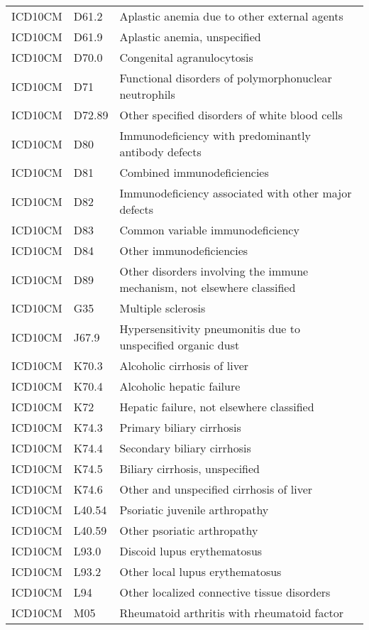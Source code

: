 \begin{longtable}{p{}p{}p{}}
  ICD10CM & D61.2 & Aplastic anemia due to other external agents \\ 
  ICD10CM & D61.9 & Aplastic anemia, unspecified \\ 
  ICD10CM & D70.0 & Congenital agranulocytosis \\ 
  ICD10CM & D71 & Functional disorders of polymorphonuclear neutrophils \\ 
  ICD10CM & D72.89 & Other specified disorders of white blood cells \\ 
  ICD10CM & D80 & Immunodeficiency with predominantly antibody defects \\ 
  ICD10CM & D81 & Combined immunodeficiencies \\ 
  ICD10CM & D82 & Immunodeficiency associated with other major defects \\ 
  ICD10CM & D83 & Common variable immunodeficiency \\ 
  ICD10CM & D84 & Other immunodeficiencies \\ 
  ICD10CM & D89 & Other disorders involving the immune mechanism, not elsewhere classified \\ 
  ICD10CM & G35 & Multiple sclerosis \\ 
  ICD10CM & J67.9 & Hypersensitivity pneumonitis due to unspecified organic dust \\ 
  ICD10CM & K70.3 & Alcoholic cirrhosis of liver \\ 
  ICD10CM & K70.4 & Alcoholic hepatic failure \\ 
  ICD10CM & K72 & Hepatic failure, not elsewhere classified \\ 
  ICD10CM & K74.3 & Primary biliary cirrhosis \\ 
  ICD10CM & K74.4 & Secondary biliary cirrhosis \\ 
  ICD10CM & K74.5 & Biliary cirrhosis, unspecified \\ 
  ICD10CM & K74.6 & Other and unspecified cirrhosis of liver \\ 
  ICD10CM & L40.54 & Psoriatic juvenile arthropathy \\ 
  ICD10CM & L40.59 & Other psoriatic arthropathy \\ 
  ICD10CM & L93.0 & Discoid lupus erythematosus \\ 
  ICD10CM & L93.2 & Other local lupus erythematosus \\ 
  ICD10CM & L94 & Other localized connective tissue disorders \\ 
  ICD10CM & M05 & Rheumatoid arthritis with rheumatoid factor \\ 

\end{longtable}
